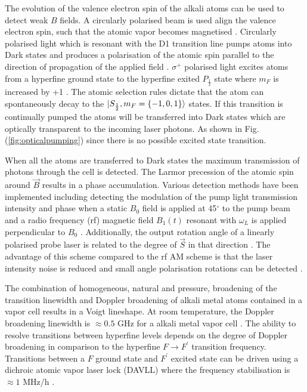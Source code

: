 The evolution of the valence electron spin of the alkali atoms can be used to detect weak $B$ fields. A circularly polarised beam is used align the valence electron spin, such that the atomic vapor becomes magnetised \citep{Sander2012MagnetoencephalographyMagnetometer.}. Circularly polarised light which is resonant with the D1 transition line pumps atoms into Dark states and produces a polarisation of the atomic spin parallel to the direction of propagation of the applied field \citep{Groeger2006AMagnetometer}. $\sigma^{+}$ polarised light excites atoms from a hyperfine ground state to the hyperfine exited $P_{\frac{1}{2}}$ state where $m_{F}$ is increased by +1  \citep{Birzhandi2013EffectPhenomenon}. The atomic selection rules \citep{Steane2002AtomicMatter} dictate that the atom can spontaneously decay to the $\lvert S_{\frac{1}{2}}, m_{F}=\{-1,0,1\}\rangle$ states. If this transition is continually pumped the atoms will be transferred into Dark states which are optically transparent to the incoming laser photons. As shown in Fig. (\ref{fig:opticalpumping}) since there is no possible excited state transition.      

When all the atoms are transferred to Dark states the maximum transmission of photons through the cell is detected. The Larmor precession of the atomic spin around $\vec{B}$ results in a phase accumulation. Various detection methods have been implemented including detecting the modulation of the pump light transmission intensity and phase when a static $B_{0}$ field is applied at 45$^{\circ}$ to the pump beam and a radio frequency (rf) magnetic field $B_{1}(t)$ resonant with $\omega_{L}$ is applied perpendicular to $B_{0}$ \citep{Schwindt2007Chip-scaleTechnique,Groeger2006AMagnetometer}. Additionally, the output rotation angle of a linearly polarised probe laser is related to the degree of $\vec{S}$ in that direction  \citep{XiaMagnetoencephalographyMagnetometer,Kominis2003AMagnetometer}. The advantage of this scheme compared to the rf AM scheme is that the laser intensity noise is reduced and small angle polarisation rotations can be detected \citep{Budker2007OpticalMagnetometry}.  

The combination of homogeneous, natural and pressure, broadening of the transition linewidth and Doppler broadening of alkali metal atoms contained in a vapor cell results in a Voigt lineshape. At room temperature, the Doppler broadening linewidth is $\approx 0.5$ GHz for a alkali metal vapor cell \citep{Yariv2006PhotonicsCommunications,Siddons2008AbsoluteExperiment}. The ability to resolve transitions between hyperfine levels depends on the degree of Doppler broadening in comparison to the hyperfine $F \rightarrow F^{'}$ transition frequency. Transitions between a $F$ ground state and $F^{'}$ excited state can be driven using a dichroic atomic vapor laser lock (DAVLL) where the frequency stabilisation is $\approx 1$ MHz/h \citep{Bison2004DevelopmentCardio-magnetometer,Imanishi2005FrequencyCell}. 

